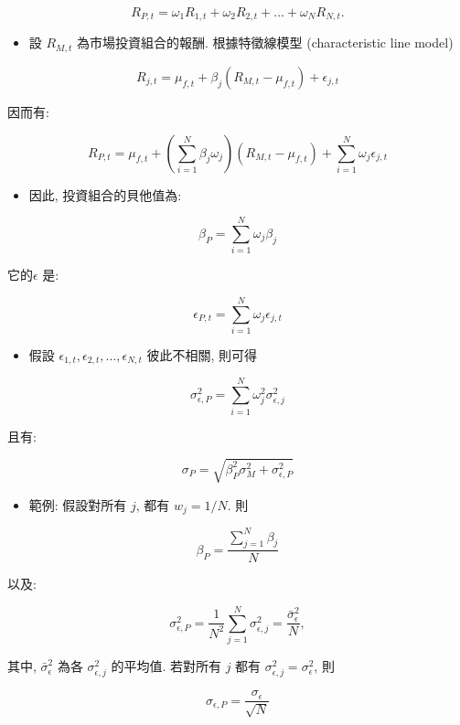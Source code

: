 \documentclass[letterpaper]{article}
\begin{document}
$$
R_{P, t}=\omega_{1} R_{1, t}+\omega_{2} R_{2, t}+\ldots+\omega_{N} R_{N, t} .
$$

\begin{itemize}
	\item 設 $R_{M, t}$ 為市場投資組合的報酬. 根據特徵線模型 (characteristic line model) 
\end{itemize}


$$
R_{j, t}=\mu_{f, t}+\beta_{j}\left (R_{M, t}-\mu_{f, t}\right) +\epsilon_{j, t}
$$

因而有: 

$$
R_{P, t}=\mu_{f, t}+\left (\sum_{i=1}^{N} \beta_{j} \omega_{j}\right) \left (R_{M, t}-\mu_{f, t}\right) +\sum_{i=1}^{N} \omega_{j} \epsilon_{j, t}
$$

\begin{itemize}
	\item 因此, 投資組合的貝他值為: 
\end{itemize}


$$
\beta_{P}=\sum_{i=1}^{N} \omega_{j} \beta_{j}
$$

它的$\epsilon$ 是: 

$$
\epsilon_{P, t}=\sum_{i=1}^{N} \omega_{j} \epsilon_{j, t}
$$

\begin{itemize}
	\item 假設 $\epsilon_{1, t}, \epsilon_{2, t}, \ldots, \epsilon_{N, t}$ 彼此不相關, 則可得
\end{itemize}


$$
\sigma_{\epsilon, P}^{2}=\sum_{i=1}^{N} \omega_{j}^{2} \sigma_{\epsilon, j}^{2}
$$

且有: 

$$
\sigma_{P}=\sqrt{\beta_{P}^{2} \sigma_{M}^{2}+\sigma_{\epsilon, P}^{2}}
$$


\begin{itemize}
	\item 範例: 假設對所有 $j$, 都有 $w_{j} = 1 / N$. 則
\end{itemize}

$$
\beta_{P}=\frac{\sum_{j=1}^{N} \beta_{j}}{N}
$$

以及: 

$$
\sigma_{\epsilon, P}^{2}=\frac{1}{N^{2}} \sum_{j=1}^{N} \sigma_{\epsilon, j}^{2}=\frac{\bar{\sigma}_{\epsilon}^{2}}{N}, 
$$

其中, $\bar{\sigma}_{\epsilon}^{2}$ 為各 $\sigma_{\epsilon, j}^{2}$ 的平均值. 若對所有 $j$ 都有 $\sigma_{\epsilon, j}^{2} = \sigma_{\epsilon}^{2}$, 則


$$
\sigma_{\epsilon, P}=\frac{\sigma_{\epsilon}}{\sqrt{N}}
$$
\end{document}
